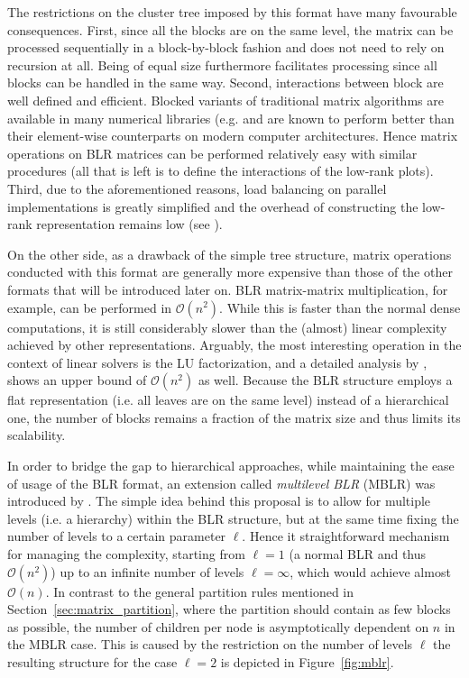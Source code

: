 The restrictions on the cluster tree imposed by this format have many favourable consequences. First, since all the blocks are on the same level, the matrix can be processed sequentially in a block-by-block fashion and does not need to rely on recursion at all. Being of equal size furthermore facilitates processing since all blocks can be handled in the same way. Second, interactions between block are well defined and efficient. Blocked variants of traditional matrix algorithms are available in many numerical libraries (e.g. \cite{anderson_lapack_1999} and are known to perform better than their element-wise counterparts on modern computer architectures. Hence matrix operations on BLR matrices can be performed relatively easy with similar procedures (all that is left is to define the interactions of the low-rank plots). Third, due to the aforementioned reasons, load balancing on parallel implementations is greatly simplified and the overhead of constructing the low-rank representation remains low (see \cite{amestoy_improving_2015}). 

On the other side, as a drawback of the simple tree structure, matrix operations conducted with this format are generally more expensive than those of the other formats that will be introduced later on. BLR matrix-matrix multiplication, for example, can be performed in $\mathcal{O}(n^2)$. While this is faster than the normal dense computations, it is still considerably slower than the (almost) linear complexity achieved by other representations. Arguably, the most interesting operation in the context of linear solvers is the LU factorization, and a detailed analysis by \cite{amestoy_complexity_2017}, shows an upper bound of $\mathcal{O}(n^2)$ as well. Because the BLR structure employs a flat representation (i.e. all leaves are on the same level) instead of a hierarchical one, the number of blocks remains a fraction of the matrix size and thus limits its scalability.

In order to bridge the gap to hierarchical approaches, while maintaining the ease of usage of the BLR format, an extension called \textit{multilevel BLR} (MBLR) was introduced by \cite{amestoy_bridging_2019}. The simple idea behind this proposal is to allow for multiple levels (i.e. a hierarchy) within the BLR structure, but at the same time fixing the number of levels to a certain parameter $\ell$. Hence it straightforward mechanism for managing the complexity, starting from $\ell=1$ (a normal BLR and thus $\mathcal{O}(n^2)$) up to an infinite number of levels $\ell=\infty$, which would achieve almost $\mathcal{O}(n)$. In contrast to the general partition rules mentioned in Section~\hyperref[sec:matrix_partition]{\ref{sec:matrix_partition}}, where the partition should contain as few blocks as possible, the number of children per node is asymptotically dependent on $n$ in the MBLR case. This is caused by the restriction on the number of levels $\ell$ the resulting structure for the case $\ell = 2$ is depicted in Figure~\hyperref[fig:mblr]{\ref{fig:mblr}}.

